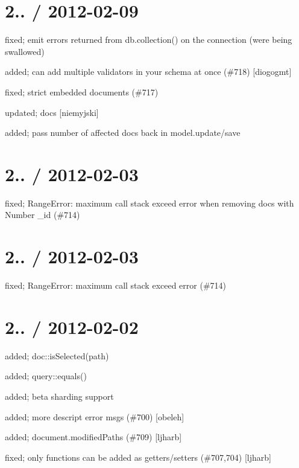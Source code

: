\section*{2.. / 2012-\/02-\/09 }


\begin{DoxyItemize}
\item fixed; emit errors returned from db.\+collection() on the connection (were being swallowed)
\item added; can add multiple validators in your schema at once (\#718) \mbox{[}diogogmt\mbox{]}
\item fixed; strict embedded documents (\#717)
\item updated; docs \mbox{[}niemyjski\mbox{]}
\item added; pass number of affected docs back in model.\+update/save
\end{DoxyItemize}

\section*{2.. / 2012-\/02-\/03 }


\begin{DoxyItemize}
\item fixed; Range\+Error\+: maximum call stack exceed error when removing docs with Number \+\_\+id (\#714)
\end{DoxyItemize}

\section*{2.. / 2012-\/02-\/03 }


\begin{DoxyItemize}
\item fixed; Range\+Error\+: maximum call stack exceed error (\#714)
\end{DoxyItemize}

\section*{2.. / 2012-\/02-\/02 }


\begin{DoxyItemize}
\item added; doc\+::is\+Selected(path)
\item added; query\+::equals()
\item added; beta sharding support
\item added; more descript error msgs (\#700) \mbox{[}obeleh\mbox{]}
\item added; document.\+modified\+Paths (\#709) \mbox{[}ljharb\mbox{]}
\item fixed; only functions can be added as getters/setters (\#707,704) \mbox{[}ljharb\mbox{]}
\end{DoxyItemize}

